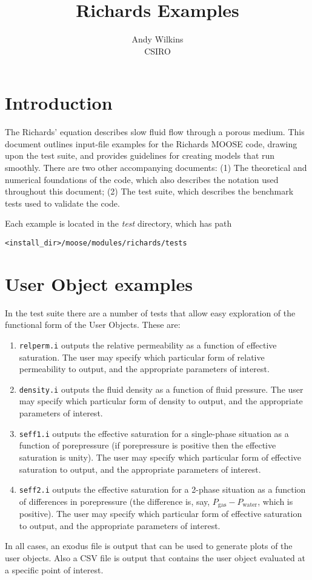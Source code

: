 \documentclass[]{scrreprt}
\begin{document}
\title{Richards Examples}
\author{Andy Wilkins \\
CSIRO}
\maketitle

\tableofcontents

\chapter{Introduction}

The Richards' equation describes slow fluid flow through a porous
medium.  This document outlines input-file examples for the Richards
MOOSE code, drawing upon the test suite, and provides guidelines for
creating models that run smoothly.  There are two other accompanying
documents: (1) The theoretical and numerical foundations of the code,
which also describes the notation used throughout this document; (2)
The test suite, which describes the benchmark tests used to validate
the code.

Each example is located in the {\em test} directory, which has path
\begin{verbatim}
<install_dir>/moose/modules/richards/tests
\end{verbatim}


\chapter{User Object examples}

In the test suite there are a number of tests that allow easy
exploration of the functional form of the User Objects.  These are:
\begin{enumerate}
\item {\tt relperm.i} outputs the relative permeability as a function
  of effective saturation.  The user may specify which particular form
  of relative permeability to output, and the appropriate parameters
  of interest.
\item {\tt density.i} outputs the fluid density as a function of fluid
  pressure.  The user may specify which particular form of density to
  output, and the appropriate parameters of interest.
\item {\tt seff1.i} outputs the effective saturation for a
  single-phase situation as a function of porepressure (if
  porepressure is positive then the effective saturation is unity).
  The user may specify which particular form of effective saturation
  to output, and the appropriate parameters of interest.
\item {\tt seff2.i} outputs the effective saturation for a 2-phase
  situation as a function of differences in porepressure (the
  difference is, say, $P_{\mathrm{gas}} - P_{\mathrm{water}}$, which
  is positive).  The user may specify which particular form of
  effective saturation to output, and the appropriate parameters of
  interest.
\end{enumerate}
In all cases, an exodus file is output that can be used to generate
plots of the user objects.  Also a CSV file is output that contains
the user object evaluated at a specific point of interest.
\end{document}

